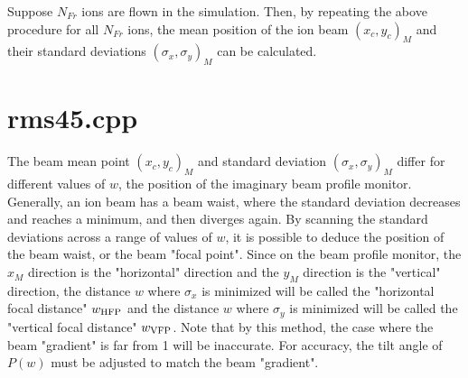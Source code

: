\documentclass{article}
\begin{document}
Suppose $N_{Fr}$ ions are flown in the simulation. Then, by repeating the above procedure for all $N_{Fr}$ ions, the mean position of the ion beam $(x_c, y_c)_M$ and their standard deviations $(\sigma_x,\sigma_y)_M$ can be calculated.




\section{rms45.cpp}
The beam mean point $(x_c,y_c)_M$ and standard deviation $(\sigma_x,\sigma_y)_M$ differ for different values of $w$, the position of the imaginary beam profile monitor. Generally, an ion beam has a beam waist, where the standard deviation decreases and reaches a minimum, and then diverges again. By scanning the standard deviations across a range of values of $w$, it is possible to deduce the position of the beam waist, or the beam "focal point". Since on the beam profile monitor, the $x_M$ direction is the "horizontal" direction and the $y_M$ direction is the "vertical" direction, the distance $w$ where $\sigma_x$ is minimized will be called the "horizontal focal distance" $w_{{\rm HFP}}$ and the distance $w$ where $\sigma_y$ is minimized will be called the "vertical focal distance" $w_{{\rm VFP}}$. Note that by this method, the case where the beam "gradient" is far from 1 will be inaccurate. For accuracy, the tilt angle of $P(w)$ must be adjusted to match the beam "gradient".
\end{document}
